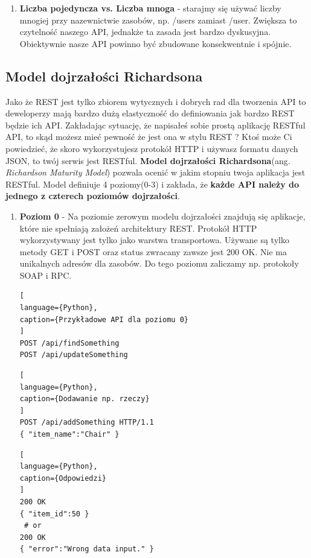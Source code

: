 \documentclass[oneside,polski,logo,indent]{amuthesis}
\begin{document}
\begin{enumerate}
\begin{enumerate}
\begin{enumerate}
\item \textbf{Liczba pojedyncza vs. Liczba mnoga} - starajmy się używać liczby mnogiej przy nazewnictwie zasobów, np. /users zamiast /user. Zwiększa to czytelność naszego API, jednakże ta zasada jest bardzo dyskusyjna. Obiektywnie nasze API powinno być zbudowane konsekwentnie i spójnie. 
\end{enumerate}

\begin{center}
\section{Model dojrzałości Richardsona}
\end{center}

Jako że REST jest tylko zbiorem wytycznych i dobrych rad dla tworzenia API to deweloperzy mają bardzo dużą elastyczność do definiowania jak bardzo REST będzie ich API. Zakładając sytuację, że napisałeś sobie prostą aplikację RESTful API, to skąd możesz mieć pewność że jest ona w stylu REST ? Ktoś może Ci powiedzieć, że skoro wykorzystujesz protokół HTTP i używasz formatu danych JSON, to twój serwis jest RESTful. \textbf{Model dojrzałości Richardsona}(ang. \emph{Richardson Maturity Model}) pozwala ocenić w jakim stopniu twoja aplikacja jest RESTful. Model definiuje 4 poziomy(0-3) i zakłada, że \textbf{każde API należy do jednego z czterech poziomów dojrzałości}.

\begin{enumerate}
\item \textbf{Poziom 0} - Na poziomie zerowym modelu dojrzałości znajdują się aplikacje, które nie spełniają założeń architektury REST. Protokół HTTP wykorzystywany jest tylko jako warstwa transportowa. Używane są tylko metody GET i POST oraz status zwracany zawsze jest 200 OK. Nie ma unikalnych adresów dla zasobów. Do tego poziomu zaliczamy np. protokoły SOAP i RPC.

\begin{lstlisting}[
language={Python},
caption={Przykładowe API dla poziomu 0}
]
POST /api/findSomething
POST /api/updateSomething
\end{lstlisting}

\begin{lstlisting}[
language={Python},
caption={Dodawanie np. rzeczy}
]
POST /api/addSomething HTTP/1.1
{ "item_name":"Chair" }
\end{lstlisting}

\begin{lstlisting}[
language={Python},
caption={Odpowiedzi}
]
200 OK
{ "item_id":50 }
 # or
200 OK
{ "error":"Wrong data input." }
\end{lstlisting}


\end{enumerate}
\end{enumerate}
\end{enumerate}
\end{document}
